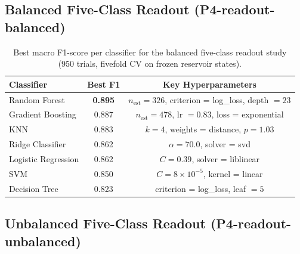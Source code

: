 \documentclass[journal=asbcd6,manuscript=suppinfo]{achemso}
\begin{document}
\subsection{Balanced Five-Class Readout (P4-readout-balanced)}

\begin{table}[H]
    \centering
    \caption{Best macro F1-score per classifier for the balanced five-class readout study (950 trials, fivefold CV on frozen reservoir states).}
    \label{tab:P4-readout-balanced}
    \small
    \begin{tabular}{lcc}
        \toprule
        Classifier & Best F1 & Key Hyperparameters \\
        \midrule
        Random Forest & \textbf{0.895} & $n_{\mathrm{est}} = 326$, criterion = log\_loss, depth $= 23$  \\
        Gradient Boosting & 0.887 & $n_{\mathrm{est}} = 478$, lr $= 0.83$, loss = exponential \\
        KNN & 0.883 & $k = 4$, weights = distance, $p = 1.03$ \\
        Ridge Classifier & 0.862 & $\alpha = 70.0$, solver = svd \\
        Logistic Regression & 0.862 & $C = 0.39$, solver = liblinear \\
        SVM & 0.850 & $C = 8 \times 10^{-5}$, kernel = linear \\
        Decision Tree & 0.823 & criterion = log\_loss, leaf $= 5$ \\
        \bottomrule
    \end{tabular}
\end{table}

\subsection{Unbalanced Five-Class Readout (P4-readout-unbalanced)}
\end{document}
